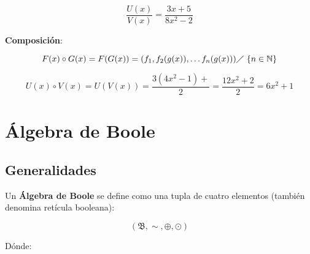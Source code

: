 \begin{enumerate}[I.]
{\ejem

\begin{equation}
\frac{U(x)}{V(x)} = \frac{3 x + 5}{8 x^2 - 2}
\end{equation}


}

{
\item \textbf{Composición}:

\begin{equation}
F(x) \circ G(x) = F(G(x)) = (f_1, f_2(g(x)), \ldots f_n(g(x))) \diagup\ \{n \in 
\mathbb{N}\}
\end{equation}

\ejem

\begin{equation}
U(x) \circ V(x) = U(V(x)) = \frac{3(4x^2 -1) + }{2} = \frac{12x^2 + 2}{2} = 6x^2 
+1 
\end{equation}


}
\end{enumerate}


\section{Álgebra de Boole}

\subsection{Generalidades}

 Un \textbf{Álgebra de Boole} se define como una tupla de cuatro elementos 
(también denomina retícula booleana):

\begin{equation}
(\mathfrak{B}, \sim, \oplus, \odot)
\end{equation}

Dónde:

